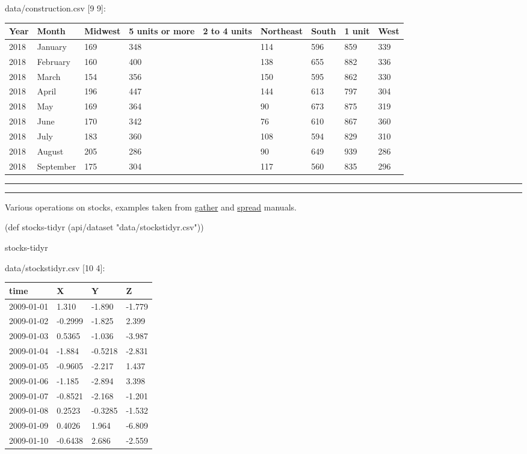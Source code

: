 \documentclass[]{article}
\newenvironment{Shaded}{\begin{snugshade}}{\end{snugshade}}
\newcommand{\StringTok}[1]{\textcolor[rgb]{0.31,0.60,0.02}{#1}}
\newcommand{\FunctionTok}[1]{\textcolor[rgb]{0.00,0.00,0.00}{#1}}
\newcommand{\BuiltInTok}[1]{#1}
\newcommand{\NormalTok}[1]{#1}
\begin{document}
data/construction.csv {[}9 9{]}:

\begin{longtable}[]{@{}lllllllll@{}}
\toprule
Year & Month & Midwest & 5 units or more & 2 to 4 units & Northeast &
South & 1 unit & West\tabularnewline
\midrule
\endhead
2018 & January & 169 & 348 & & 114 & 596 & 859 & 339\tabularnewline
2018 & February & 160 & 400 & & 138 & 655 & 882 & 336\tabularnewline
2018 & March & 154 & 356 & & 150 & 595 & 862 & 330\tabularnewline
2018 & April & 196 & 447 & & 144 & 613 & 797 & 304\tabularnewline
2018 & May & 169 & 364 & & 90 & 673 & 875 & 319\tabularnewline
2018 & June & 170 & 342 & & 76 & 610 & 867 & 360\tabularnewline
2018 & July & 183 & 360 & & 108 & 594 & 829 & 310\tabularnewline
2018 & August & 205 & 286 & & 90 & 649 & 939 & 286\tabularnewline
2018 & September & 175 & 304 & & 117 & 560 & 835 & 296\tabularnewline
\bottomrule
\end{longtable}

\begin{center}\rule{0.5\linewidth}{0.5pt}\end{center}

\begin{center}\rule{0.5\linewidth}{0.5pt}\end{center}

Various operations on stocks, examples taken from
\href{https://tidyr.tidyverse.org/reference/gather.html}{gather} and
\href{https://tidyr.tidyverse.org/reference/spread.html}{spread}
manuals.

\begin{Shaded}
\begin{Highlighting}[]
\NormalTok{(}\BuiltInTok{def}\FunctionTok{ stocks-tidyr }\NormalTok{(api/dataset }\StringTok{"data/stockstidyr.csv"}\NormalTok{))}
\end{Highlighting}
\end{Shaded}

\begin{Shaded}
\begin{Highlighting}[]
\NormalTok{stocks-tidyr}
\end{Highlighting}
\end{Shaded}

data/stockstidyr.csv {[}10 4{]}:

\begin{longtable}[]{@{}llll@{}}
\toprule
time & X & Y & Z\tabularnewline
\midrule
\endhead
2009-01-01 & 1.310 & -1.890 & -1.779\tabularnewline
2009-01-02 & -0.2999 & -1.825 & 2.399\tabularnewline
2009-01-03 & 0.5365 & -1.036 & -3.987\tabularnewline
2009-01-04 & -1.884 & -0.5218 & -2.831\tabularnewline
2009-01-05 & -0.9605 & -2.217 & 1.437\tabularnewline
2009-01-06 & -1.185 & -2.894 & 3.398\tabularnewline
2009-01-07 & -0.8521 & -2.168 & -1.201\tabularnewline
2009-01-08 & 0.2523 & -0.3285 & -1.532\tabularnewline
2009-01-09 & 0.4026 & 1.964 & -6.809\tabularnewline
2009-01-10 & -0.6438 & 2.686 & -2.559\tabularnewline
\bottomrule
\end{longtable}
\end{document}
